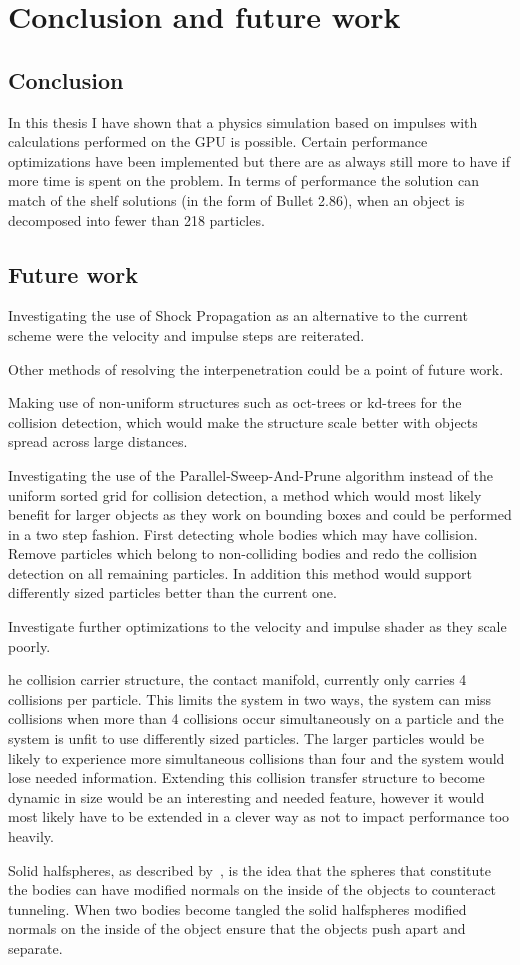 \chapter{Conclusion and future work}
\section{Conclusion}
In this thesis I have shown that a physics simulation based on impulses with
calculations performed on the GPU is possible. Certain performance optimizations
have been implemented but there are as always still more to have if more time is
spent on the problem. In terms of performance the solution can match of the shelf
solutions (in the form of Bullet 2.86), when an object is decomposed into fewer than
218 particles.

\section{Future work}
Investigating the use of Shock Propagation as an alternative to the current scheme
were the velocity and impulse steps are reiterated.

Other methods of resolving the interpenetration could be a point of future work.

Making use of non-uniform structures such as oct-trees or kd-trees for the collision
detection, which would make the structure scale better with objects spread across
large distances.

Investigating the use of the Parallel-Sweep-And-Prune algorithm instead of the
uniform sorted grid for collision detection, a method which would most likely
benefit for larger objects as they work on bounding boxes and could be performed
in a two step fashion. First detecting whole bodies which may have collision.
Remove particles which belong to non-colliding bodies and redo the collision detection
on all remaining particles. In addition this method would support differently sized
particles better than the current one.

Investigate further optimizations to the velocity and impulse shader as they scale poorly.

he collision carrier structure, the contact manifold, currently only carries
4 collisions per particle. This limits the system in two ways, the system can miss
collisions when more than 4 collisions occur simultaneously on a particle and the
system is unfit to use differently sized particles. The larger particles would
be likely to experience more simultaneous collisions than four and the system would
lose needed information. Extending this collision transfer structure to become dynamic
in size would be an interesting and needed feature, however it would most likely have
to be extended in a clever way as not to impact performance too heavily.

Solid halfspheres, as described by~\cite{flex}, is the idea that the spheres that
constitute the bodies can have modified normals on the inside of the objects to counteract
tunneling. When two bodies become tangled the solid halfspheres modified normals
on the inside of the object ensure that the objects push apart and separate.
